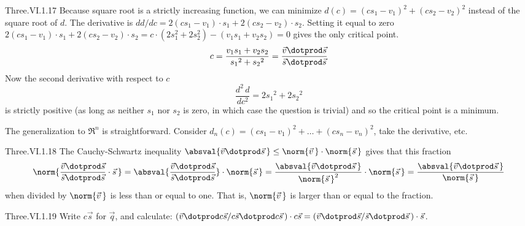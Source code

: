 \begin{ans}{Three.VI.1.17}
      Because square root is a strictly increasing function, we can
      minimize \( d(c)=(cs_1-v_1)^2+(cs_2-v_2)^2 \) instead of the square root
      of \( d \).
      The derivative is
      $dd/dc=2(cs_1-v_1)\cdot s_1 +2(cs_2-v_2)\cdot s_2$.
      Setting it equal to zero
      $2(cs_1-v_1)\cdot s_1 +2(cs_2-v_2)\cdot s_2
        =c\cdot(2s_1^2+2s_2^2)-(v_1s_1+v_2s_2)=0$
      gives the only critical point.
      \begin{equation*}
        c=\frac{v_1s_1+v_2s_2}{{s_1}^2+{s_2}^2}
         =\frac{\vec{v}\dotprod\vec{s}}{\vec{s}\dotprod\vec{s}}
      \end{equation*}
      Now the second derivative with respect to $c$
      \begin{equation*}
        \frac{d^2\,d}{dc^2}=2{s_1}^2+2{s_2}^2
      \end{equation*}
      is strictly positive (as long as neither  \( s_1 \) nor \( s_2 \)
      is zero, in which case the question is trivial)
      and so the critical point is a minimum.

      The generalization to $\Re^n$ is straightforward.
      Consider $d_n(c)=(cs_1-v_1)^2+\dots+(cs_n-v_n)^2$, take the derivative,
      etc.
    
\end{ans}
\begin{ans}{Three.VI.1.18}
      The Cauchy-Schwartz inequality
      $\absval{\vec{v}\dotprod\vec{s}\,}
         \leq\norm{\vec{v}\,}\cdot\norm{\vec{s}\,}$
      gives that this fraction
      \begin{equation*}
        \norm{\frac{\vec{v}\dotprod\vec{s}}{\vec{s}\dotprod\vec{s}}
              \cdot\vec{s}\, }
        =\absval{\frac{\vec{v}\dotprod\vec{s}}{
                       \vec{s}\dotprod\vec{s}}}
         \cdot\norm{\vec{s}\, }
        =
        \frac{\absval{\vec{v}\dotprod\vec{s}\,}}{
              \norm{\vec{s}\,}^2}\cdot\norm{\vec{s}\,}
        =
        \frac{\absval{\vec{v}\dotprod\vec{s}\,}}{\norm{\vec{s}\,}}
      \end{equation*}
      when divided by \( \norm{\vec{v}\,} \) is less than or equal to one.
      That is, \( \norm{\vec{v}\,} \) is larger than or equal to the fraction.
    
\end{ans}
\begin{ans}{Three.VI.1.19}
       Write \( c\vec{s} \) for \( \vec{q} \), and
       calculate:
       \( (\vec{v}\dotprod c\vec{s}/c\vec{s}\dotprod c\vec{s}\,)\cdot c\vec{s}=
          (\vec{v}\dotprod \vec{s}/\vec{s}\dotprod \vec{s}\,)\cdot \vec{s} \).
    
\end{ans}
